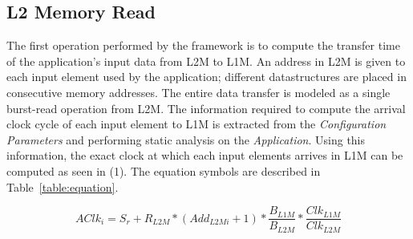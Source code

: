 %

\vspace{-1mm}
\subsection{L2 Memory Read}
\label{ssec:l2_read_model}
\vspace{-1mm}
The first operation performed by the framework is to compute the transfer time of the application's input data from L2M to L1M. An address in L2M is given to each input element used by the application; different datastructures are placed in consecutive memory addresses. The entire data transfer is modeled as a single burst-read operation from L2M. The information required to compute the arrival clock cycle of each input element to L1M is extracted from the \textit{Configuration Parameters} and performing static analysis on the \textit{Application}.
Using this information, the exact clock at which each input elements arrives in L1M can be computed as seen in (1). The equation symbols are described in Table~\ref{table:equation}.

\begin{equation}
AClk_i = S_r + R_{L2M} * (Add_{L2Mi}+1) * \frac{B_{L1M}}{B_{L2M}} * \frac{Clk_{L1M}}{Clk_{L2M}}
\end{equation}

